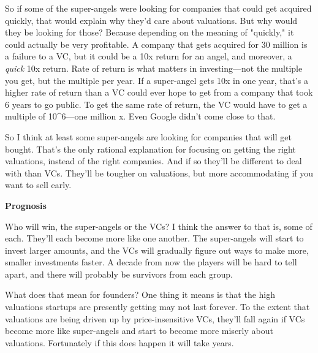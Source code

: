 So if some of the super-angels
                    were looking for companies that could get acquired quickly,
                    that would explain why they'd care about valuations. But why
                    would they be looking for those? Because depending on the
                    meaning of "quickly," it could actually be very profitable.
                    A company that gets acquired for 30 million is a failure to
                    a VC, but it could be a 10x return for an angel, and
                    moreover, a \emph{quick} 10x return. Rate of return is what
                    matters in investing---not the multiple you get, but the
                    multiple per year. If a super-angel gets 10x in one year,
                    that's a higher rate of return than a VC could ever hope to
                    get from a company that took 6 years to go public. To get
                    the same rate of return, the VC would have to get a multiple
                    of 10\textasciicircum{}6---one million x. Even Google didn't come close
                    to that.

So I think at least some super-angels
                    are looking for companies that will get bought. That's the
                    only rational explanation for focusing on getting the right
                    valuations, instead of the right companies. And if so
                    they'll be different to deal with than VCs. They'll be
                    tougher on valuations, but more accommodating if you want to
                    sell early.

\textbf{Prognosis}

Who will
                    win, the super-angels or the VCs? I think the answer to that
                    is, some of each. They'll each become more like one another.
                    The super-angels will start to invest larger amounts, and
                    the VCs will gradually figure out ways to make more, smaller
                    investments faster. A decade from now the players will be
                    hard to tell apart, and there will probably be survivors
                    from each group.

What does that mean for
                    founders? One thing it means is that the high valuations
                    startups are presently getting may not last forever. To the
                    extent that valuations are being driven up by
                    price-insensitive VCs, they'll fall again if VCs become more
                    like super-angels and start to become more miserly about
                    valuations. Fortunately if this does happen it will take
                    years.

